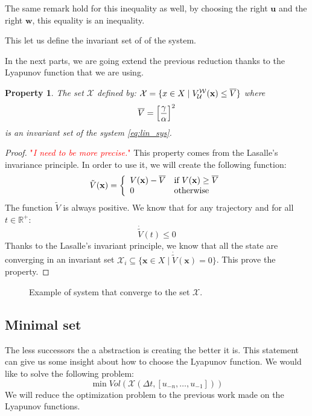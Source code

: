 \documentclass{article}
\newtheorem{property}{Property}
\theoremstyle{named}
\newcommand{\propsymbol}{\( \blacklozenge \)}
\newenvironment{prop}[0]
    {\begin{samepage}
    \begin{property}
    \renewcommand{\qedsymbol}{\propsymbol}\pushQED{\qed}
    }
    {
    \popQED %
    \end{property} 
    \end{samepage}
    }
\newcommand{\vect}[1]{\ensuremath{ \mathbf{#1}}}
\newcommand\comment[1]{\textcolor{red}{"\textit{#1}"}}
\begin{document}
The same remark hold for this inequality as well, by choosing the right $\vect{u}$ and the right $\vect{w}$, this equality is an inequality.

This let us define the invariant set of of the system.


In the next parts, we are going extend the previous reduction thanks to the Lyapunov function that we are using.
\begin{prop}
The set $\mathcal{X}$ defined by:
$\mathcal{X} = \{x \in X \mid \Vw(\vect{x}) \leq \Vsup \}$
where 
$$\overline{V} = \left[ \frac{\gamma}{\alpha} \right]^2$$
is an invariant set of the system \ref{eq:lin_sys}.
\end{prop}

\begin{proof}
\comment{I need to be more precise.}
This property comes from the Lasalle's invariance principle.
In order to use it, we will create the following function:
\newcommand{\Vt}{\tilde{V}}
\begin{equation}
\Vt(\vect{x}) =
\left \{
\begin{array}{ll}
V(\vect{x})-\Vsup& \textrm{if $V(\vect{x}) \geq \Vsup$}\\
0 & \textrm{otherwise}
\end{array}
\right.
\end{equation}
The function $\Vt$ is always positive.
We know that for any trajectory and for all $t \in \mathbb{R}^+$:
$$\dot{\Vt}(t) \leq 0$$
Thanks to the Lasalle's invariant principle, we know that all the state are converging in an invariant set $\mathcal{X}_i \subseteq \{ \vect{x} \in X \mid \dot{\Vt}(\vect{x})=0 \}$.
This prove the property.
\end{proof}

\begin{figure}
	\center
	
	\caption{Example of system that converge to the set $\mathcal{X}$.}
\end{figure}

\subsection{Minimal set}
The less successors the a abstraction is creating the better it is.
This statement can give us some insight about how to choose the Lyapunov function.
We would like to solve the following problem:
\begin{equation}
\min Vol(\mathcal{X}(\Delta t, \left[u_{-n},\dots,u_{-1} \right] ))
\end{equation}
We will reduce the optimization problem to the previous work made on the Lyapunov functions.
\end{document}
